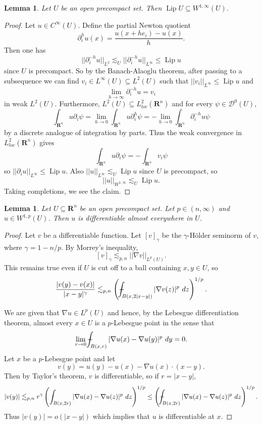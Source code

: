 \documentclass[reqno,12pt,letterpaper]{amsart}
\newcommand{\RR}{\mathbf{R}}
\DeclareMathOperator{\Lip}{Lip}
\newtheorem{lemma}[theorem]{Lemma}
\theoremstyle{definition}
\numberwithin{equation}{section}
\def\Xint#1{\mathchoice
{\XXint\displaystyle\textstyle{#1}}%
{\XXint\textstyle\scriptstyle{#1}}%
{\XXint\scriptstyle\scriptscriptstyle{#1}}%
{\XXint\scriptscriptstyle\scriptscriptstyle{#1}}%
\!\int}
\def\XXint#1#2#3{{\setbox0=\hbox{$#1{#2#3}{\int}$ }
\vcenter{\hbox{$#2#3$ }}\kern-.6\wd0}}
\def\dashint{\Xint-}
\begin{document}
\begin{lemma}
Let $U$ be an open precompact set.
Then $\Lip U \subseteq W^{1, \infty}(U)$.
\end{lemma}
\begin{proof}
Let $u \in C^\infty(U)$.
Define the partial Newton quotient
$$\partial_i^h u(x) = \frac{u(x + he_i) - u(x)}{h}.$$
Then one has
$$||\partial_i^{-h}u||_{L^2} \lesssim_U ||\partial_i^{-h} u||_{L^\infty} \leq \Lip u$$
since $U$ is precompact. So by the Banach-Alaoglu theorem, after passing to a subsequence we can find $v_i \in L^\infty(U) \subseteq L^2(U)$ such that $||v_i||_{L^\infty} \leq \Lip u$ and
$$\lim_{h \to \infty} \partial_i^{-h}u = v_i$$
in weak $L^2(U)$. Furthermore, $L^2(U) \subseteq L^2_{loc}(\RR^n)$ and for every $\psi \in \mathcal D^0(U)$,
$$\int_{\RR^n} u\partial_i \psi = \lim_{h \to 0} \int_{\RR^n} u\partial_i^h \psi = -\lim_{h \to 0} \int_{\RR^n} \partial_i^{-h}u \psi$$
by a discrete analogue of integration by parts. Thus the weak convergence in $L^2_{loc}(\RR^n)$ gives
$$\int_{\RR^n} u\partial_i \psi = -\int_{\RR^n} v_i\psi$$
so $||\partial_i u||_{L^\infty} \leq \Lip u$.
Also $||u||_{L^\infty} \lesssim_U \Lip u$ since $U$ is precompact, so
$$||u||_{W^{1, \infty}} \lesssim_U \Lip u.$$
Taking completions, we see the claim.
\end{proof}

\begin{lemma}
Let $U \subseteq \RR^n$ be an open precompact set.
Let $p \in (n, \infty)$ and $u \in W^{1,p}(U)$.
Then $u$ is differentiable almost everywhere in $U$.
\end{lemma}
\begin{proof}
Let $v$ be a differentiable function.
Let $[v]_\gamma$ be the $\gamma$-H\"older seminorm of $v$, where $\gamma = 1 - n/p$.
By Morrey's inequality,
$$[v]_\gamma \lesssim_{p, n} ||\nabla v||_{L^p(U)}.$$
This remains true even if $U$ is cut off to a ball containing $x,y \in U$, so
$$\frac{|v(y) - v(x)|}{|x - y|^\gamma} \lesssim_{p, n} \left(\dashint_{B(x, 2|x - y|)} |\nabla v(z)|^p ~dz\right)^{1/p}.$$

We are given that $\nabla u \in L^p(U)$ and hence, by the Lebesgue differentiation theorem, almost every $x \in U$ is a $p$-Lebesgue point in the sense that
$$\lim_{r \to 0} \dashint_{B(x, r)} |\nabla u(x) - \nabla u(y)|^p ~dy = 0.$$
Let $x$ be a $p$-Lebesgue point and let
$$v(y) = u(y) - u(x) - \nabla u(x) \cdot (x - y).$$
Then by Taylor's theorem, $v$ is differentiable, so if $r = |x - y|$,
$$|v(y)| \lesssim_{p, n} r^\gamma \left(\int_{B(x, 2r)}|\nabla u(x) - \nabla u(z)|^p ~dz\right)^{1/p} \leq \left(\dashint_{B(x, 2r)} |\nabla u(x) - \nabla u(z)|^p ~dz\right)^{1/p}.$$
Thus $|v(y)| = o(|x - y|)$ which implies that $u$ is differentiable at $x$.
\end{proof}
\end{document}
